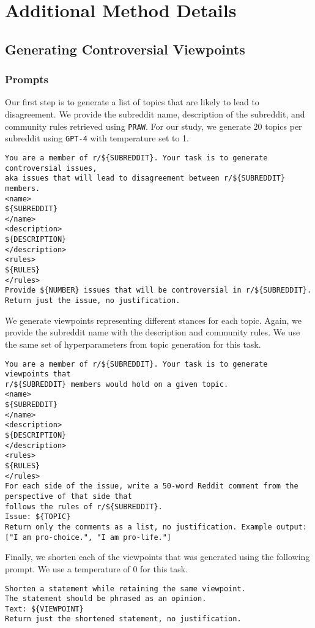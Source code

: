 \section{Additional Method Details}
\label{sec:app_details}
\subsection{Generating Controversial Viewpoints}
\label{sec:hai_design}
\subsubsection{Prompts}
Our first step is to generate a list of topics that are likely to lead to disagreement. We provide the subreddit name, description of the subreddit, and community rules retrieved using \texttt{PRAW}. For our study, we generate $20$ topics per subreddit using \texttt{GPT-4} with temperature set to 1. 
\newline
\begin{lstlisting}[style=gptprompt]
You are a member of r/${SUBREDDIT}. Your task is to generate controversial issues,
aka issues that will lead to disagreement between r/${SUBREDDIT} members.
<name>
${SUBREDDIT}
</name>
<description> 
${DESCRIPTION}
</description>
<rules>
${RULES}
</rules>
Provide ${NUMBER} issues that will be controversial in r/${SUBREDDIT}. 
Return just the issue, no justification.
\end{lstlisting}

We generate viewpoints representing different stances for each topic. Again, we provide the subreddit name with the description and community rules. We use the same set of hyperparameters from topic generation for this task. 
\newline
\begin{lstlisting}[style=gptprompt]
You are a member of r/${SUBREDDIT}. Your task is to generate viewpoints that
r/${SUBREDDIT} members would hold on a given topic.
<name>
${SUBREDDIT}
</name>
<description> 
${DESCRIPTION}
</description>
<rules>
${RULES}
</rules>
For each side of the issue, write a 50-word Reddit comment from the perspective of that side that 
follows the rules of r/${SUBREDDIT}. 
Issue: ${TOPIC}
Return only the comments as a list, no justification. Example output: ["I am pro-choice.", "I am pro-life."] 
\end{lstlisting}
 
Finally, we shorten each of the viewpoints that was generated using the following prompt. We use a temperature of $0$ for this task. 
\newline
\begin{lstlisting}[style=gptprompt]
Shorten a statement while retaining the same viewpoint. 
The statement should be phrased as an opinion.
Text: ${VIEWPOINT}
Return just the shortened statement, no justification.
\end{lstlisting}

